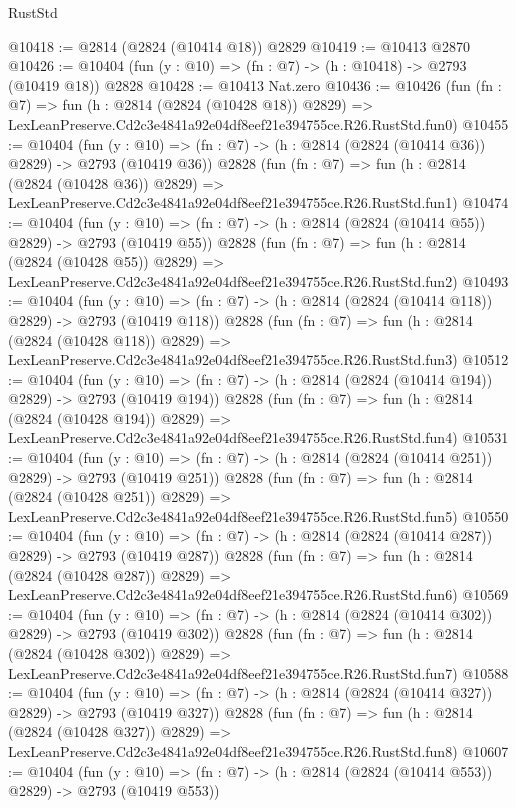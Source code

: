 \begin{lexlean}{RustStd}
\begin{coremodule}
@10418 := @2814 (@2824 (@10414 @18)) @2829
@10419 := @10413 @2870
@10426 := @10404 (fun (y : @10) => (fn : @7) -> (h : @10418) -> @2793 (@10419 @18)) @2828
@10428 := @10413 Nat.zero
@10436 := @10426
    (fun (fn : @7) =>
    fun (h : @2814 (@2824 (@10428 @18)) @2829) =>
    LexLeanPreserve.Cd2c3e4841a92e04df8eef21e394755ce.R26.RustStd.fun0)
@10455 := @10404
    (fun (y : @10) => (fn : @7) -> (h : @2814 (@2824 (@10414 @36)) @2829) -> @2793 (@10419 @36))
    @2828
    (fun (fn : @7) =>
    fun (h : @2814 (@2824 (@10428 @36)) @2829) =>
    LexLeanPreserve.Cd2c3e4841a92e04df8eef21e394755ce.R26.RustStd.fun1)
@10474 := @10404
    (fun (y : @10) => (fn : @7) -> (h : @2814 (@2824 (@10414 @55)) @2829) -> @2793 (@10419 @55))
    @2828
    (fun (fn : @7) =>
    fun (h : @2814 (@2824 (@10428 @55)) @2829) =>
    LexLeanPreserve.Cd2c3e4841a92e04df8eef21e394755ce.R26.RustStd.fun2)
@10493 := @10404
    (fun (y : @10) => (fn : @7) -> (h : @2814 (@2824 (@10414 @118)) @2829) -> @2793 (@10419 @118))
    @2828
    (fun (fn : @7) =>
    fun (h : @2814 (@2824 (@10428 @118)) @2829) =>
    LexLeanPreserve.Cd2c3e4841a92e04df8eef21e394755ce.R26.RustStd.fun3)
@10512 := @10404
    (fun (y : @10) => (fn : @7) -> (h : @2814 (@2824 (@10414 @194)) @2829) -> @2793 (@10419 @194))
    @2828
    (fun (fn : @7) =>
    fun (h : @2814 (@2824 (@10428 @194)) @2829) =>
    LexLeanPreserve.Cd2c3e4841a92e04df8eef21e394755ce.R26.RustStd.fun4)
@10531 := @10404
    (fun (y : @10) => (fn : @7) -> (h : @2814 (@2824 (@10414 @251)) @2829) -> @2793 (@10419 @251))
    @2828
    (fun (fn : @7) =>
    fun (h : @2814 (@2824 (@10428 @251)) @2829) =>
    LexLeanPreserve.Cd2c3e4841a92e04df8eef21e394755ce.R26.RustStd.fun5)
@10550 := @10404
    (fun (y : @10) => (fn : @7) -> (h : @2814 (@2824 (@10414 @287)) @2829) -> @2793 (@10419 @287))
    @2828
    (fun (fn : @7) =>
    fun (h : @2814 (@2824 (@10428 @287)) @2829) =>
    LexLeanPreserve.Cd2c3e4841a92e04df8eef21e394755ce.R26.RustStd.fun6)
@10569 := @10404
    (fun (y : @10) => (fn : @7) -> (h : @2814 (@2824 (@10414 @302)) @2829) -> @2793 (@10419 @302))
    @2828
    (fun (fn : @7) =>
    fun (h : @2814 (@2824 (@10428 @302)) @2829) =>
    LexLeanPreserve.Cd2c3e4841a92e04df8eef21e394755ce.R26.RustStd.fun7)
@10588 := @10404
    (fun (y : @10) => (fn : @7) -> (h : @2814 (@2824 (@10414 @327)) @2829) -> @2793 (@10419 @327))
    @2828
    (fun (fn : @7) =>
    fun (h : @2814 (@2824 (@10428 @327)) @2829) =>
    LexLeanPreserve.Cd2c3e4841a92e04df8eef21e394755ce.R26.RustStd.fun8)
@10607 := @10404
    (fun (y : @10) => (fn : @7) -> (h : @2814 (@2824 (@10414 @553)) @2829) -> @2793 (@10419 @553))

\end{coremodule}
\end{lexlean}
